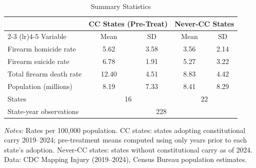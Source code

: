 \begin{table}[H]
\centering
\caption{Summary Statistics}
\begin{threeparttable}
\begin{tabular}{lcccc}
\toprule
& \multicolumn{2}{c}{CC States (Pre-Treat)} & \multicolumn{2}{c}{Never-CC States} \\
\cmidrule(lr){2-3} \cmidrule(lr){4-5}
Variable & Mean & SD & Mean & SD \\
\midrule
Firearm homicide rate & 5.62 & 3.58 & 3.56 & 2.14 \\
Firearm suicide rate & 6.78 & 1.91 & 5.27 & 3.22 \\
Total firearm death rate & 12.40 & 4.51 & 8.83 & 4.42 \\
Population (millions) & 8.19 & 7.33 & 8.41 & 8.29 \\
\midrule
States & \multicolumn{2}{c}{16} & \multicolumn{2}{c}{22} \\
State-year observations & \multicolumn{4}{c}{228} \\
\bottomrule
\end{tabular}
\begin{tablenotes}[flushleft]
\small
\item \textit{Notes:} Rates per 100,000 population. CC states: states adopting constitutional carry 2019--2024; pre-treatment means computed using only years prior to each state's adoption. Never-CC states: states without constitutional carry as of 2024. Data: CDC Mapping Injury (2019--2024), Census Bureau population estimates.
\end{tablenotes}
\end{threeparttable}
\label{tab:summary}
\end{table}
